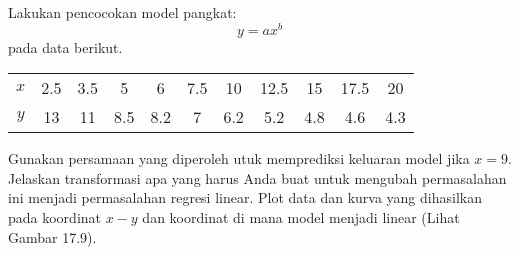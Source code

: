 \begin{soal}

Lakukan pencocokan model pangkat:
\begin{equation*}
y = a x^{b}
\end{equation*}
pada data berikut.

{\centering
\begin{tabular}{|c|cccc cccc cc|}
\hline
$x$ & 2.5 & 3.5 & 5   & 6   & 7.5 & 10  & 12.5 & 15  & 17.5 & 20 \\
$y$ & 13  & 11  & 8.5 & 8.2 & 7   & 6.2 & 5.2  & 4.8 & 4.6  & 4.3 \\
\hline
\end{tabular}
\par}

Gunakan persamaan yang diperoleh utuk memprediksi keluaran model jika
$x = 9$.
Jelaskan transformasi apa yang harus Anda buat untuk mengubah permasalahan
ini menjadi permasalahan regresi linear.
Plot data dan kurva yang dihasilkan pada koordinat $x-y$ dan koordinat di mana
model menjadi linear (Lihat Gambar 17.9).
\end{soal}